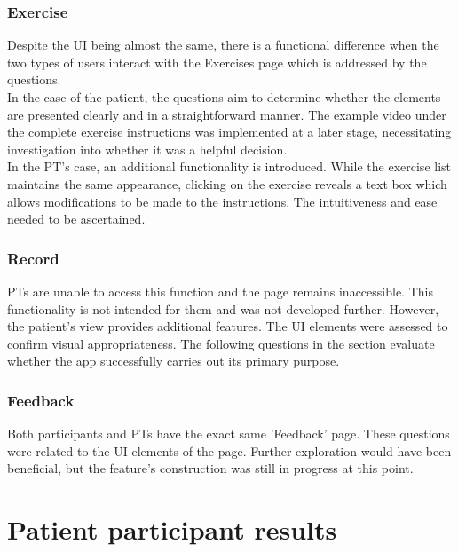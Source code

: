 \documentclass[12pt, titlepage]{article}
\begin{document}
\subsubsection{Exercise}
Despite the UI being almost the same, there is a functional difference when the two types of users 
interact with the Exercises page which is addressed by the questions.\\
In the case of the patient, the questions aim to determine whether the elements are presented clearly and in a straightforward manner.
The example video under the complete exercise instructions was implemented at a later stage, necessitating investigation into whether
it was a helpful decision. \\
In the PT's case, an additional functionality is introduced. While the exercise list maintains the same appearance, clicking on the 
exercise reveals a text box which allows modifications to be made to the instructions. The intuitiveness and ease needed to be ascertained. \\

\subsubsection{Record}
PTs are unable to access this function and the page remains inaccessible. This functionality is not intended for them and was not
developed further. 
However, the patient's view provides additional features. The UI elements were assessed to confirm visual appropriateness. 
The following questions in the section evaluate whether the app successfully carries out its primary purpose. 

\subsubsection{Feedback}
Both participants and PTs have the exact same 'Feedback' page. These questions were related to the UI elements of the page. 
Further exploration would have been beneficial, but the feature's construction was still in progress at this point.

\section{Patient participant results}
\end{document}
